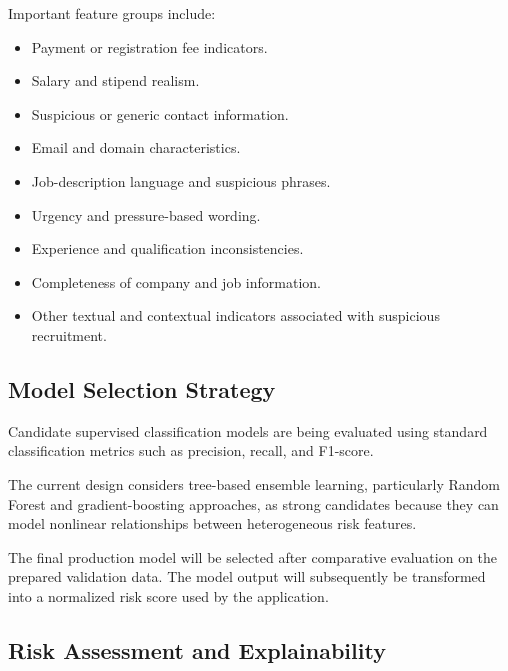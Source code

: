 \documentclass[12pt,a4paper]{report}
\begin{document}
Important feature groups include:

\begin{itemize}

    \item Payment or registration fee indicators.

    \item Salary and stipend realism.

    \item Suspicious or generic contact information.

    \item Email and domain characteristics.

    \item Job-description language and suspicious phrases.

    \item Urgency and pressure-based wording.

    \item Experience and qualification inconsistencies.

    \item Completeness of company and job information.

    \item Other textual and contextual indicators associated with suspicious recruitment.

\end{itemize}


\subsection{Model Selection Strategy}

Candidate supervised classification models are being evaluated using standard classification metrics such as precision, recall, and F1-score.

The current design considers tree-based ensemble learning, particularly Random Forest and gradient-boosting approaches, as strong candidates because they can model nonlinear relationships between heterogeneous risk features.

The final production model will be selected after comparative evaluation on the prepared validation data. The model output will subsequently be transformed into a normalized risk score used by the application.


\subsection{Risk Assessment and Explainability}
\end{document}
